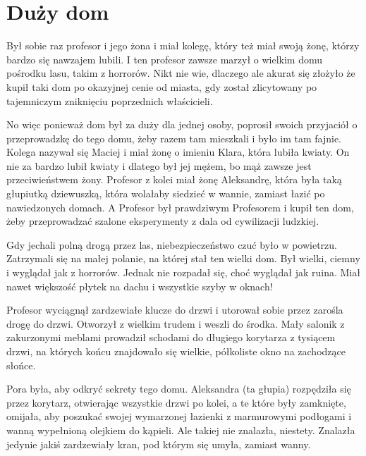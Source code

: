 \chapter{Duży dom}



Był sobie raz profesor i jego żona i miał kolegę, który też miał swoją żonę, którzy bardzo się nawzajem lubili.
I ten profesor zawsze marzył o wielkim domu pośrodku lasu, takim z horrorów.
Nikt nie wie, dlaczego ale akurat się złożyło że kupił taki dom po okazyjnej cenie od miasta, gdy został zlicytowany po tajemniczym zniknięciu poprzednich właścicieli.

No więc ponieważ dom był za duży dla jednej osoby, poprosił swoich przyjaciół o przeprowadzkę do tego domu, żeby razem tam mieszkali i było im tam fajnie.
Kolega nazywał się Maciej i miał żonę o imieniu Klara, która lubiła kwiaty.
On nie za bardzo lubił kwiaty i dlatego był jej mężem, bo mąż zawsze jest przeciwieństwem żony.
Profesor z kolei miał żonę Aleksandrę, która była taką głupiutką dziewuszką, która wolałaby siedzieć w wannie, zamiast łazić po nawiedzonych domach. A Profesor był prawdziwym Profesorem i kupił ten dom, żeby przeprowadzać szalone eksperymenty z dala od cywilizacji ludzkiej.

Gdy jechali polną drogą przez las, niebezpieczeństwo czuć było w powietrzu.
Zatrzymali się na małej polanie, na której stał ten wielki dom.
Był wielki, ciemny i wyglądał jak z horrorów. 
Jednak nie rozpadał się, choć wyglądał jak ruina.
Miał nawet większość płytek na dachu i wszystkie szyby w oknach!

Profesor wyciągnął zardzewiałe klucze do drzwi i utorował sobie przez zarośla drogę do drzwi.
Otworzył z wielkim trudem i weszli do środka.
Mały salonik z zakurzonymi meblami prowadził schodami do długiego korytarza z tysiącem drzwi, na których końcu znajdowało się wielkie, półkoliste okno na zachodzące słońce.

Pora była, aby odkryć sekrety tego domu.
Aleksandra (ta głupia) rozpędziła się przez korytarz, otwierając wszystkie drzwi po kolei, a te które były zamknięte, omijała, aby poszukać swojej wymarzonej łazienki z marmurowymi podłogami i wanną wypełnioną olejkiem do kąpieli. Ale takiej nie znalazła, niestety. Znalazła jedynie jakiś zardzewiały kran, pod którym się umyła, zamiast wanny. 


